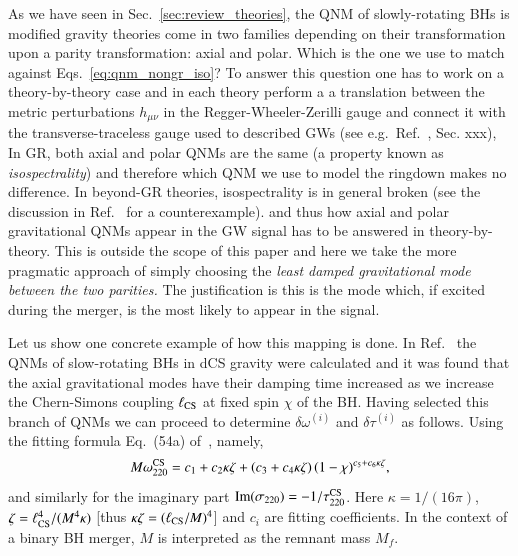 \documentclass[twocolumn,prd,aps,superscriptaddress,preprintnumbers,tightenlines,showpacs,nofootinbib,amsfonts,amsmath,longbibliography]{revtex4-1}
\newcommand{\Mf}{M_f}
\begin{document}
As we have seen in Sec.~\ref{sec:review_theories}, the QNM of slowly-rotating BHs
is modified gravity theories come in two families depending on their transformation upon a parity
transformation: axial and polar. Which is the one we use to match against Eqs.~\eqref{eq:qnm_nongr_iso}?
%
To answer this question one has to work on a theory-by-theory case and in each theory perform a
a translation between the metric perturbations $h_{\mu\nu}$ in the Regger-Wheeler-Zerilli gauge and
connect it with the transverse-traceless gauge used to described GWs (see e.g.~Ref.~\cite{Maggiore:2018sht}, Sec. xxx),
%
In GR, both axial and polar QNMs are the same (a property known as \emph{isospectrality}) and therefore which
QNM we use to model the ringdown makes no difference.
%
In beyond-GR theories, isospectrality is in general broken (see the discussion
in Ref.~\cite{Hui:2021cpm} for a counterexample). and thus how axial and polar
gravitational QNMs appear in the GW signal has to be answered in
theory-by-theory.
%
This is outside the scope of this paper and here we take the more pragmatic
approach of simply choosing the \emph{least damped gravitational mode between
the two parities.}
%
The justification is this is the mode which, if excited during the merger, is
the most likely to appear in the signal.

Let us show one concrete example of how this mapping is done.
%
In Ref.~\cite{Wagle:2021tam} the QNMs of slow-rotating BHs in dCS gravity were calculated
and it was found that the axial gravitational modes have their damping time increased as we
increase the Chern-Simons coupling $\ell_{\rm CS}$ at fixed spin $\chi$ of the BH.
%
Having selected this branch of QNMs we can proceed to determine $\delta\omega^{(i)}$ and $\delta\tau^{(i)}$ as follows.
%
Using the fitting formula Eq.~(54a) of~\cite{Wagle:2021tam}, namely,
%
\begin{equation}
    M \omega^{\rm CS}_{220} = c_{1} + c_{2} \kappa \zeta + (c_{3} + c_{4} \kappa \zeta) \, (1 - \chi)^{c_{5} + c_{6} \kappa \zeta},
    \label{eq:omega_dsc_eg}
\end{equation}
%
and similarly for the imaginary part ${\rm Im}(\sigma_{220}) =  - 1 / \tau^{\rm CS}_{220}$.
%
Here $\kappa = 1/(16 \pi)$, $\zeta = \ell_{\rm CS}^{4} / (M^4 \kappa)$ [thus $\kappa \zeta = (\ell_{\rm CS} / M)^4$]
and $c_{i}$ are fitting coefficients.
%
In the context of a binary BH merger, $M$ is interpreted as the remnant mass $\Mf$.
\end{document}
